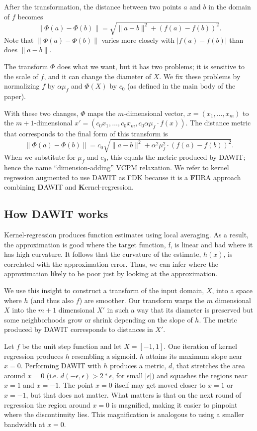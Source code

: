 After the transformation, the distance between two points $a$ and $b$ in the
domain of $f$ becomes
$$\|\Phi(a)- \Phi(b)\| = \sqrt{\|a-b\|^2 + (f(a) - f(b))^2}.$$
Note that $\|\Phi(a)- \Phi(b)\|$ varies more closely with $|f(a) - f(b)|$
than does $\|a-b\|$.

The transform $\Phi$ does what we want, but it has two problems;
 it is sensitive to the scale of $f$, and it can change the diameter of $X$.
We fix these problems by normalizing $f$ by $\alpha\mu_f$ and $\Phi(X)$ by $c_0$
(as defined in the main body of the paper).

With these two changes, $\Phi$ maps the $m$-dimensional vector, $x = (x_1, \ldots, x_m)$
to the $m+1$-dimensional $x' = (c_0x_1, \ldots, c_0x_m, c_0\alpha\mu_f\cdot f(x))$.
The distance metric that corresponds to the final form of this transform is
 $$\|\Phi(a)- \Phi(b)\| = c_0 \sqrt{ \|a-b\|^2 + \alpha^2\mu_f^2\cdot(f(a) - f(b))^2}.$$
When we substitute for $\mu_f$ and $c_0$, this equals the metric produced by DAWIT;
hence the name ``dimension-adding'' VCPM relaxation.
We refer to kernel regression augmented to use DAWIT as FDK because it is a
\textbf{F}IIRA approach combining \textbf{D}AWIT and \textbf{K}ernel-regression.


\subsection{How DAWIT works}
Kernel-regression produces function estimates using local averaging.
As a result, the approximation is good where the target function, f,
is linear and bad where it has high curvature. It follows that the
curvature of the estimate, $h(x)$, is correlated with the approximation
error. Thus, we can infer where the approximation likely to be poor
just by looking at the approximation.

We use this insight to construct a transform of the input domain, $X$,
into a space where $h$ (and thus also $f$) are smoother. Our transform
warps the $m$ dimensional $X$ into the $m+1$ dimensional $X'$ in such a way
that its diameter is preserved but some neighborhoods grow or shrink
depending on the slope of $h$. The metric produced by DAWIT corresponds
to distances in $X'$.

Let $f$ be the unit step function and let $X = [-1,1]$. One iteration of
kernel regression produces $h$ resembling a sigmoid. $h$ attains its maximum
slope near $x=0$. Performing DAWIT with $h$ produces a metric, $d$, that
stretches the area around $x=0$ (i.e. $d(-\epsilon, \epsilon) > 2*\epsilon$,
for small $|\epsilon|$) and squashes the regions near $x=1$ and $x=-1$. The
point $x=0$ itself may get moved closer to $x=1$ or $x=-1$, but that
does not matter. What matters is that on the next round of regression
the region around $x=0$ is magnified, making it easier to pinpoint where
the discontinuity lies. This magnification is analogous to using a smaller bandwidth at $x=0$.

